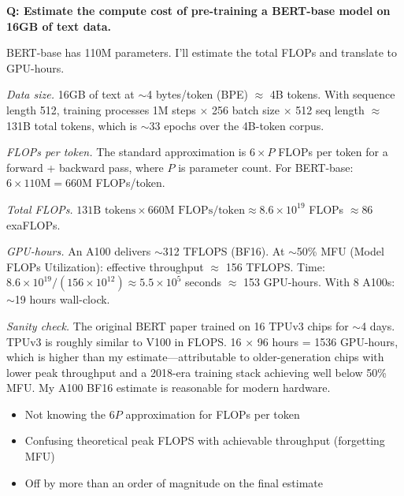 \begin{interviewq}
\textbf{Q: Estimate the compute cost of pre-training a BERT-base model on 16GB of text data.}

 \quad {} \quad \badgefreq{\freqmed}

\stronganswer BERT-base has 110M parameters. I'll estimate the total FLOPs and translate to GPU-hours.

\textit{Data size.} 16GB of text at $\sim$4 bytes/token (BPE) $\approx$ 4B tokens. With sequence length 512, training processes 1M steps $\times$ 256 batch size $\times$ 512 seq length $\approx$ 131B total tokens, which is $\sim$33 epochs over the 4B-token corpus.

\textit{FLOPs per token.} The standard approximation is $6 \times P$ FLOPs per token for a forward + backward pass, where $P$ is parameter count. For BERT-base: $6 \times 110\text{M} = 660\text{M}$ FLOPs/token.

\textit{Total FLOPs.} $131\text{B tokens} \times 660\text{M FLOPs/token} \approx 8.6 \times 10^{19}$ FLOPs $\approx 86$ exaFLOPs.

\textit{GPU-hours.} An A100 delivers $\sim$312 TFLOPS (BF16). At $\sim$50\% MFU (Model FLOPs Utilization): effective throughput $\approx$ 156 TFLOPS. Time: $8.6 \times 10^{19} / (156 \times 10^{12}) \approx 5.5 \times 10^5$ seconds $\approx$ 153 GPU-hours. With 8 A100s: $\sim$19 hours wall-clock.

\textit{Sanity check.} The original BERT paper trained on 16 TPUv3 chips for $\sim$4 days. TPUv3 is roughly similar to V100 in FLOPS. 16 $\times$ 96 hours = 1536 GPU-hours, which is higher than my estimate---attributable to older-generation chips with lower peak throughput and a 2018-era training stack achieving well below 50\% MFU. My A100 BF16 estimate is reasonable for modern hardware.

\redflags
\begin{itemize}
    \item Not knowing the $6P$ approximation for FLOPs per token
    \item Confusing theoretical peak FLOPS with achievable throughput (forgetting MFU)
    \item Off by more than an order of magnitude on the final estimate
\end{itemize}



\end{interviewq}
